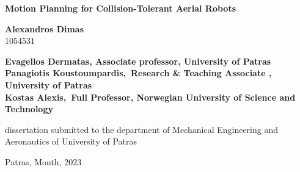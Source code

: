 \documentclass[twoside]{report}
\begin{document}
\begin{titlepage}
\vspace{1cm}

\Large{\textbf{Motion Planning for Collision-Tolerant Aerial Robots}}

\vspace{1.2cm}

\Large{\textbf{Alexandros Dimas}}\\
\large 1054531

\vspace{1.2cm}
\textbf{Evagellos Dermatas, Associate professor, University of Patras}\\
\textbf{Panagiotis Koustoumpardis,\ Research \& Teaching Associate , \\University of Patras}\\
\textbf{Kostas Alexis,\ Full Professor, Norwegian University of Science and Technology}

\vspace{1.2cm}
dissertation submitted to the department of Mechanical Engineering and Aeronautics of University of Patras

\vspace{0.2cm}
\Large Patras, Month, 2023
\end{titlepage}
\newpage


\mbox{}
\vfill
\end{document}
